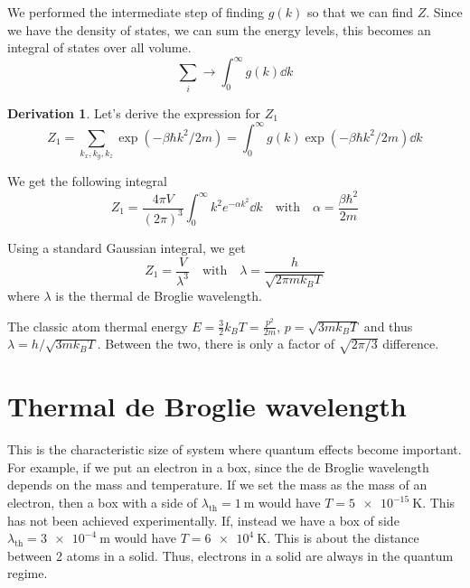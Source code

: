 \documentclass[12pt,chapterprefix=false,dvipsnames]{scrbook}
\theoremstyle{dotless}
\theoremstyle{definition}
\newtheorem{protoderivation}{Derivation}[section]
\newenvironment{derivation}
{\colorlet{shadecolor}{purple!15}\begin{shaded}\begin{protoderivation}}
			{\end{protoderivation}\end{shaded}}
\begin{document}
We performed the intermediate step of finding
$g\left(k\right)$ so that we can find
$Z$. Since we have the density of states, we
can sum the energy levels, this becomes an integral of states
over all volume.
\begin{equation}
	\sum_i \rightarrow \int^\infty_0 g\left(k\right)
	\dd{k}
\end{equation}

\begin{derivation}
	Let's derive the expression for $Z_1$
	\begin{equation}
		Z_1 = \sum_{k_x,k_y,k_z} \exp\left(-\beta \hbar k^2 / 2m\right) =
		\int_0^\infty g\left(k\right)
		\exp\left(-\beta \hbar k^2 / 2m\right) \dd{k}
	\end{equation}

	We get the following integral
	\begin{equation}
		Z_1
        =
        \frac{4\pi V}{{\left(2\pi\right)}^3} \int_0^\infty k^2
		e^{-\alpha k^2} \dd{k}
		\hspace{1em} \mathrm{with}
		\hspace{1em} \alpha = \frac{\beta \hbar^2}{2m}
	\end{equation}

	Using a standard Gaussian integral, we get
	\begin{equation}
		\label{eq:partition_function}
		Z_1 = \frac{V}{\lambda^3} \hspace{1em}
		\mathrm{with} \hspace{1em} \lambda =
		\frac{h}{\sqrt{2\pi m k_B T}}
	\end{equation}
	where $\lambda$ is the thermal de Broglie
	wavelength.

	The classic atom thermal energy $E = \frac{3}{2}k_B	T = \frac{p^2}{2m}$,
	$ p = \sqrt{3 m k_B T} $ and thus $ \lambda = h / \sqrt{3m k_B T} $.
	Between the two, there is only a factor of
	$\sqrt{2\pi/3}$ difference.
\end{derivation}

\section{Thermal de Broglie wavelength}%
\label{sec:thermal_de_broglie_wavelength}

This is the characteristic size of system where quantum effects
become important. For example, if we put an electron in a box,
since the de Broglie wavelength depends on the mass and
temperature. If we set the mass as the mass of an electron, then
a box with a side of $\lambda_{\mathrm{th}} =
	\SI{1}{\metre}$ would have
$T = \SI{ 5e-15 }{\kelvin}$. This has not been achieved
experimentally. If, instead we have a box of side
$\lambda_{\mathrm{th}} =
	\SI{3e-4}{\metre}$ would have $T = \SI{ 6e4 }{\kelvin}$. This
is about the distance between 2 atoms in a solid. Thus,
electrons in a solid are always in the quantum regime.
\end{document}
